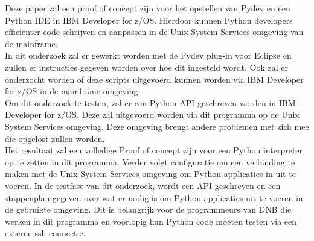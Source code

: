 Deze paper zal een proof of concept zijn voor het opstellen van Pydev en een Python IDE in IBM Developer for z/OS. Hierdoor kunnen Python developers efficiënter code schrijven en aanpassen in de Unix System Services omgeving van de mainframe. \\

In dit onderzoek zal er gewerkt worden met de Pydev plug-in voor Eclipse en zullen er instructies gegeven worden over hoe dit ingesteld wordt. Ook zal er onderzocht worden of deze scripts uitgevoerd kunnen worden via IBM Developer for z/OS in de mainframe omgeving. \\

Om dit onderzoek te testen, zal er een Python API geschreven worden in IBM Developer for z/OS. Deze zal uitgevoerd worden via dit programma op de Unix System Services omgeving. Deze omgeving brengt andere problemen met zich mee die opgelost zullen worden. \\

Het resultaat zal een volledige Proof of concept zijn voor een Python interpreter op te zetten in dit programma. Verder volgt configuratie om een verbinding te maken met de Unix System Services omgeving om Python applicaties in uit te voeren. In de testfase van dit onderzoek, wordt een API geschreven en een stappenplan gegeven over wat er nodig is om Python applicaties uit te voeren in de gebruikte omgeving. Dit is belangrijk voor de programmeurs van DNB die werken in dit programma en voorlopig hun Python code moeten testen via een externe ssh connectie.
